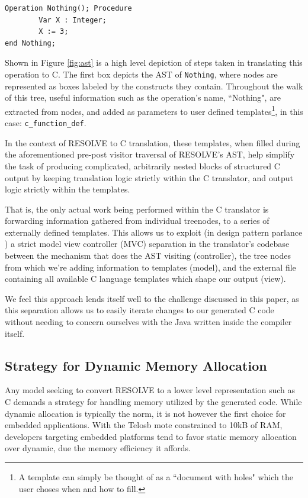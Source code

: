 \begin{verbatim}
Operation Nothing(); Procedure
        Var X : Integer;
        X := 3;
end Nothing;
\end{verbatim}

Shown in Figure \ref{fig:ast} is a high level depiction of steps taken in translating this operation to C. The first box depicts the AST of \texttt{Nothing}, where nodes are represented as boxes labeled by the constructs they contain. Throughout the walk of this tree, useful information such as the operation's name, ``Nothing", are extracted from nodes, and added as parameters to user defined templates\footnote{A template can simply be thought of as a ``document with holes" which the user choses when and how to fill.}, in this case: \texttt{c\_function\_def}.

In the context of RESOLVE to C translation, these templates, when filled during the aforementioned pre-post visitor traversal of RESOLVE's AST, help simplify the task of producing complicated, arbitrarily nested blocks of structured C output by keeping translation logic strictly within the C translator, and output logic strictly within the templates.

That is, the only actual work being performed within the C translator is forwarding information gathered from individual treenodes, to a series of externally defined templates. This allows us to exploit (in design pattern parlance \cite{krasner:1988}) a strict model view controller (MVC) separation in the translator's codebase between the mechanism that does the AST visiting (controller), the tree nodes from which we're adding information to templates (model), and the external file containing all available C language templates which shape our output (view).

We feel this approach lends itself well to the challenge discussed in this paper, as this separation allows us to easily iterate changes to our generated C code without needing to concern ourselves with the Java written inside the compiler itself.

\subsection{Strategy for Dynamic Memory Allocation}\label{sec:mem}

Any model seeking to convert RESOLVE to a lower level representation such as C demands a strategy for handling memory utilized by the generated code. While dynamic allocation is typically the norm, it is not however the first choice for embedded applications. With the Telosb mote constrained to 10kB of RAM, developers targeting embedded platforms tend to favor static memory allocation over dynamic, due the memory efficiency it affords. 

